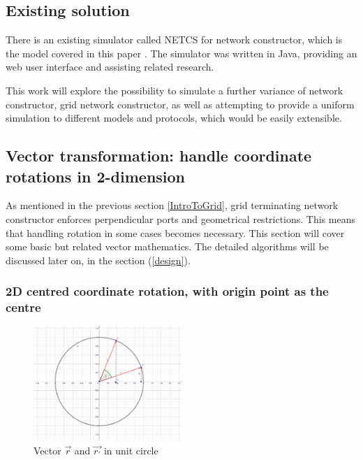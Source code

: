 \subsection{Existing solution}
There is an existing simulator called NETCS \cite{DBLP:journals/corr/AmaxilatisLMS15} for network constructor, which is the model covered
in this paper \cite{MS16a}. The simulator was written in Java, providing an web user interface
and assisting related research.

\par\noindent
This work will explore the possibility to simulate a further variance of network constructor, grid network constructor, as well as attempting
to provide a uniform simulation to different models and protocols, which would be easily extensible.

\subsection{Vector transformation: handle coordinate rotations in 2-dimension}


\par\noindent
As mentioned in the previous section \ref{IntroToGrid}, grid terminating network constructor enforces perpendicular ports
and geometrical restrictions. This means that handling rotation in some cases becomes necessary.
This section will cover some basic but related vector mathematics. The detailed algorithms will be discussed later on, in the section (\ref{design}).

\subsubsection{2D centred coordinate rotation, with origin point as the centre}

\par\noindent

\begin{figure}[H]
\begin{center}
\includegraphics[width=0.5\textwidth]{context/diagram/2d_vector.pdf}
\caption{Vector $\vec{r}$ and $\vec{r_{'}}$ in unit circle}

\label{vectorG}
\end{center}
\end{figure}

